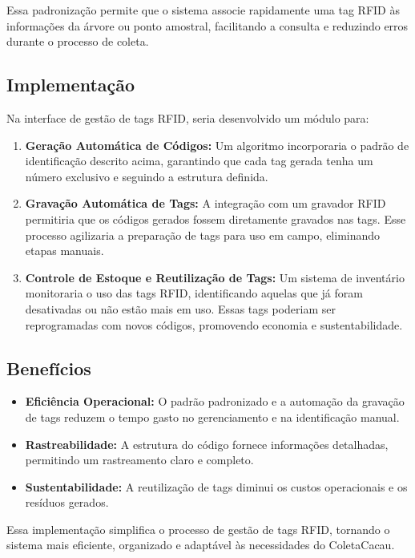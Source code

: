 Essa padronização permite que o sistema associe rapidamente uma tag RFID às informações da árvore ou ponto amostral, facilitando a consulta e reduzindo erros durante o processo de coleta.

\subsection{Implementação}

Na interface de gestão de tags RFID, seria desenvolvido um módulo para:
\begin{enumerate}
    \item \textbf{Geração Automática de Códigos:}
    Um algoritmo incorporaria o padrão de identificação descrito acima, garantindo que cada tag gerada tenha um número exclusivo e seguindo a estrutura definida.

    \item \textbf{Gravação Automática de Tags:}
    A integração com um gravador RFID permitiria que os códigos gerados fossem diretamente gravados nas tags. Esse processo agilizaria a preparação de tags para uso em campo, eliminando etapas manuais.

    \item \textbf{Controle de Estoque e Reutilização de Tags:}
    Um sistema de inventário monitoraria o uso das tags RFID, identificando aquelas que já foram desativadas ou não estão mais em uso. Essas tags poderiam ser reprogramadas com novos códigos, promovendo economia e sustentabilidade.
\end{enumerate}

\subsection{Benefícios}

\begin{itemize}
    \item \textbf{Eficiência Operacional:} O padrão padronizado e a automação da gravação de tags reduzem o tempo gasto no gerenciamento e na identificação manual.
    \item \textbf{Rastreabilidade:} A estrutura do código fornece informações detalhadas, permitindo um rastreamento claro e completo.
    \item \textbf{Sustentabilidade:} A reutilização de tags diminui os custos operacionais e os resíduos gerados.
\end{itemize}

Essa implementação simplifica o processo de gestão de tags RFID, tornando o sistema mais eficiente, organizado e adaptável às necessidades do ColetaCacau.

